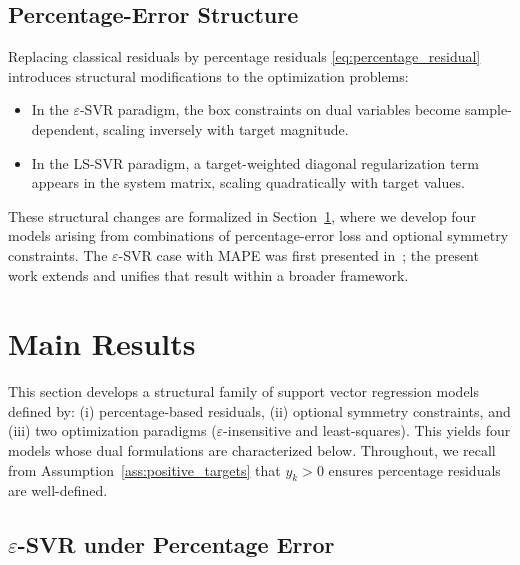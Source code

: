 \documentclass[mathematics,article,submit,pdftex,moreauthors]{Definitions/mdpi}
\begin{document}
\subsection{Percentage-Error Structure}\label{subsec:percentage_structure}

Replacing classical residuals by percentage residuals \eqref{eq:percentage_residual}
introduces structural modifications to the optimization problems:
\begin{itemize}
\item In the $\varepsilon$-SVR paradigm, the box constraints on dual variables become sample-dependent, 
scaling inversely with target magnitude.
\item In the LS-SVR paradigm, a target-weighted diagonal regularization term appears in the system matrix, 
scaling quadratically with target values.
\end{itemize}

These structural changes are formalized in Section~\ref{sec:main_results}, where we develop 
four models arising from combinations of percentage-error loss and optional symmetry constraints.
The $\varepsilon$-SVR case with MAPE was first presented in~\cite{benavides2025support}; 
the present work extends and unifies that result within a broader framework.

\section{Main Results}\label{sec:main_results}

This section develops a structural family of support vector regression models defined by:
(i) percentage-based residuals,
(ii) optional symmetry constraints, and
(iii) two optimization paradigms ($\varepsilon$-insensitive and least-squares).
This yields four models whose dual formulations are characterized below.
Throughout, we recall from Assumption~\ref{ass:positive_targets} that $y_k > 0$ ensures percentage residuals are well-defined.


\subsection{$\varepsilon$-SVR under Percentage Error}\label{subsec:eps_pe}
\end{document}
